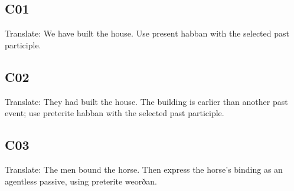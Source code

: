 \subsection*{C01}

\par\begin{minipage}{\linewidth}\raggedright
Translate: We have built the house. Use present habban with the selected past participle.

\end{minipage}\par\addvspace{4pt}

\subsection*{C02}

\par\begin{minipage}{\linewidth}\raggedright
Translate: They had built the house. The building is earlier than another past event; use preterite habban with the selected past participle.

\end{minipage}\par\addvspace{4pt}

\subsection*{C03}

\par\begin{minipage}{\linewidth}\raggedright
Translate: The men bound the horse. Then express the horse’s binding as an agentless passive, using preterite weorðan.

\end{minipage}\par\addvspace{4pt}

